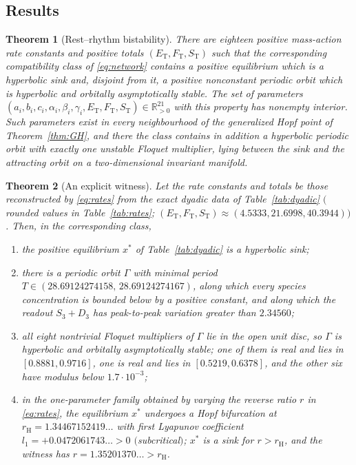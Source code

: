 \documentclass[11pt,a4paper]{article}
\theoremstyle{plain}
\newtheorem{theorem}{Theorem}[section]
\theoremstyle{definition}
\theoremstyle{remark}
\newcommand{\R}{\mathbb R}
\newcommand{\ET}{E_{\mathrm T}}
\newcommand{\FT}{F_{\mathrm T}}
\newcommand{\ST}{S_{\mathrm T}}
\begin{document}
\subsection{Results}

\begin{theorem}[Rest--rhythm bistability]\label{thm:coexist}
There are eighteen positive mass-action rate constants and positive totals $(\ET,\FT,\ST)$ such that the corresponding compatibility class of \eqref{eq:network} contains a positive equilibrium which is a hyperbolic sink and, disjoint from it, a positive nonconstant periodic orbit which is hyperbolic and orbitally asymptotically stable. The set of parameters $(a_i,b_i,c_i,\alpha_i,\beta_i,\gamma_i,\ET,\FT,\ST)\in\R^{21}_{>0}$ with this property has nonempty interior. Such parameters exist in every neighbourhood of the generalized Hopf point of Theorem~\ref{thm:GH}, and there the class contains in addition a hyperbolic periodic orbit with exactly one unstable Floquet multiplier, lying between the sink and the attracting orbit on a two-dimensional invariant manifold.
\end{theorem}

\begin{theorem}[An explicit witness]\label{thm:finite}
Let the rate constants and totals be those reconstructed by \eqref{eq:rates} from the exact dyadic data of Table~\ref{tab:dyadic} $($rounded values in Table~\ref{tab:rates}; $(\ET,\FT,\ST)\approx(4.5333,21.6998,40.3944))$. Then, in the corresponding class,
\begin{enumerate}[label=\textup{(\roman*)},leftmargin=*]
\item the positive equilibrium $x^*$ of Table~\ref{tab:dyadic} is a hyperbolic sink;
\item there is a periodic orbit $\Gamma$ with minimal period $T\in(28.69124274158,\,28.69124274167)$, along which every species concentration is bounded below by a positive constant, and along which the readout $S_3+D_3$ has peak-to-peak variation greater than $2.34560$;
\item all eight nontrivial Floquet multipliers of $\Gamma$ lie in the open unit disc, so $\Gamma$ is hyperbolic and orbitally asymptotically stable; one of them is real and lies in $[0.8881,0.9716]$, one is real and lies in $[0.5219,0.6378]$, and the other six have modulus below $1.7\cdot10^{-3}$;
\item in the one-parameter family obtained by varying the reverse ratio $r$ in \eqref{eq:rates}, the equilibrium $x^*$ undergoes a Hopf bifurcation at $r_{\mathrm H}=1.34467152419\ldots$ with first Lyapunov coefficient $l_1=+0.0472061743\ldots>0$ $($subcritical$)$; $x^*$ is a sink for $r>r_{\mathrm H}$, and the witness has $r=1.35201370\ldots>r_{\mathrm H}$.
\end{enumerate}
\end{theorem}
\end{document}
